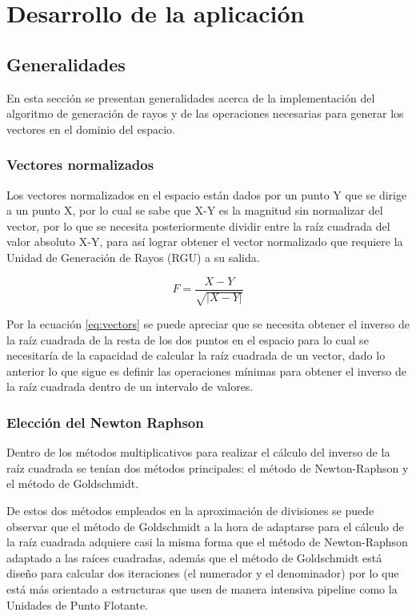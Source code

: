 \chapter{Desarrollo de la aplicación}

\section{Generalidades}

En esta sección se presentan generalidades acerca de la implementación del algoritmo de generación de rayos y de las operaciones necesarias para generar los vectores en el dominio del espacio.

\subsection{Vectores normalizados}

Los vectores normalizados en el espacio están dados por un punto Y que se dirige a un punto X, por lo cual se sabe que X-Y es la magnitud sin normalizar del vector, por lo que se necesita posteriormente dividir entre la raíz cuadrada del valor absoluto X-Y, para así lograr obtener el vector normalizado que requiere la Unidad de Generación de Rayos (RGU) a su salida.

\begin{equation}
\label{eq:vectors}
  F = \frac{X-Y}{\sqrt{|X-Y|}}
\end{equation} 

Por la ecuación \eqref{eq:vectors} se puede apreciar que se necesita obtener el inverso de la raíz cuadrada de la resta de los dos puntos en el espacio para lo cual se necesitaría de la capacidad de calcular la raíz cuadrada de un vector, dado lo anterior lo que sigue es definir las operaciones mínimas para obtener el inverso de la raíz cuadrada dentro de un intervalo de valores. 

\subsection{Elección del Newton Raphson}

Dentro de los métodos multiplicativos para realizar el cálculo del inverso de la raíz cuadrada se tenían dos métodos principales: el método de Newton-Raphson y el método de Goldschmidt.

De estos dos métodos empleados en la aproximación de divisiones se puede observar que el método de Goldschmidt a la hora de adaptarse para el cálculo de la raíz cuadrada adquiere casi la misma forma que el método de Newton-Raphson adaptado a las raíces cuadradas, además que el método de Goldschmidt está diseño para calcular dos iteraciones (el numerador y el denominador) por lo que está más orientado a estructuras que usen de manera intensiva pipeline como la Unidades de Punto Flotante.

